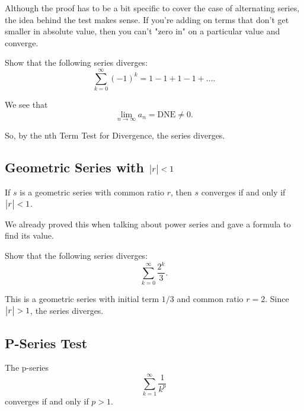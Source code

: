 Although the proof has to be a bit specific to cover the case of alternating series, the idea behind the test makes sense.
If you're adding on terms that don't get smaller in absolute value, then you can't "zero in" on a particular value and converge.

\begin{example}
	Show that the following series diverges:
	\begin{equation*}
		\sum_{k=0}^{\infty}{(-1)^k} = 1 - 1 + 1 - 1 + \ldots.
	\end{equation*}
\end{example}
\begin{answer}
	We see that
	\begin{equation*}
		\lim_{n\to\infty}{a_n} = \text{DNE} \neq 0.
	\end{equation*}
	
	So, by the nth Term Test for Divergence, the series diverges.
\end{answer}

\subsection{Geometric Series with $\big\lvert r \big\rvert < 1$}
\begin{lemma}
	If $s$ is a geometric series with common ratio $r$, then $s$ converges if and only if $\big\lvert r \big\rvert < 1$.
\end{lemma}

We already proved this when talking about power series and gave a formula to find its value.

\begin{example}
	Show that the following series diverges:
	\begin{equation*}
		\sum_{k=0}^{\infty}{\frac{2^k}{3}}.
	\end{equation*}	
\end{example}
\begin{answer}
	This is a geometric series with initial term $1/3$ and common ratio $r=2$.
	Since $\big\lvert r \big\rvert > 1$, the series diverges.
\end{answer}

\subsection{P-Series Test}
\begin{lemma}
	The p-series
	\begin{equation*}
		\sum_{k=1}^{\infty}{\frac{1}{k^p}}
	\end{equation*}
	converges if and only if $p > 1$.
\end{lemma}


